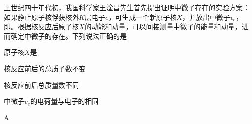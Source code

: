 上世纪四十年代初，我国科学家王淦昌先生首先提出证明中微子存在的实验方案：如果静止原子核俘获核外\(K\)层电子\(e\)，可生成一个新原子核\(X\)，并放出中微子\(v_e\)，即。根据核反应后原子核\(X\)的动能和动量，可以间接测量中微子的能量和动量，进而确定中微子的存在。下列说法正确的是\paren[]
\begin{choices}
	\item 原子核\(X\)是
	\item 核反应前后的总质子数不变
	\item 核反应前后总质量数不同
	\item 中微子\(v_e\)的电荷量与电子的相同
\end{choices}
\begin{answer}
	A
\end{answer}